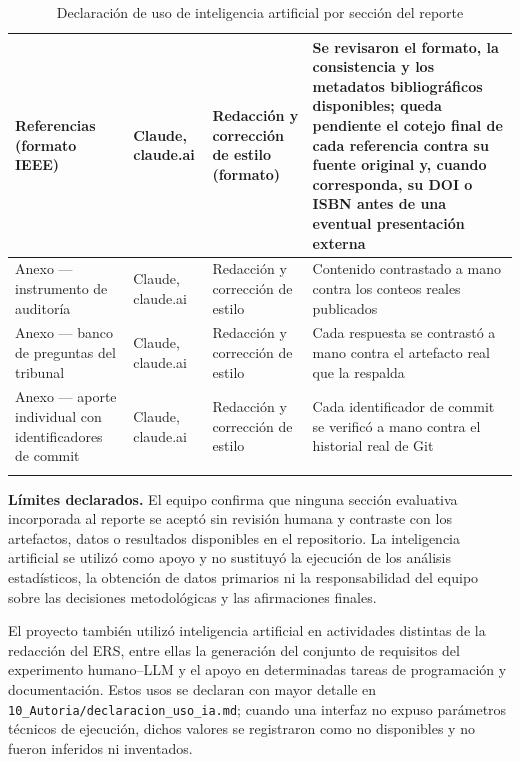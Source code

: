 \begin{longtable}{|L{2.6cm}|L{3.0cm}|L{3.6cm}|L{5.8cm}|}
Referencias (formato IEEE) & Claude, claude.ai & Redacción y corrección de estilo (formato) & Se revisaron el formato, la consistencia y los metadatos bibliográficos disponibles; queda pendiente el cotejo final de cada referencia contra su fuente original y, cuando corresponda, su DOI o ISBN antes de una eventual presentación externa \\ \hline
Anexo --- instrumento de auditoría & Claude, claude.ai & Redacción y corrección de estilo & Contenido contrastado a mano contra los conteos reales publicados \\ \hline
Anexo --- banco de preguntas del tribunal & Claude, claude.ai & Redacción y corrección de estilo & Cada respuesta se contrastó a mano contra el artefacto real que la respalda \\ \hline
Anexo --- aporte individual con identificadores de commit & Claude, claude.ai & Redacción y corrección de estilo & Cada identificador de commit se verificó a mano contra el historial real de Git \\ \hline
\caption{Declaración de uso de inteligencia artificial por sección del reporte}
\end{longtable}

\noindent\textbf{Límites declarados.} El equipo confirma que ninguna sección
evaluativa incorporada al reporte se aceptó sin revisión humana y contraste
con los artefactos, datos o resultados disponibles en el repositorio. La
inteligencia artificial se utilizó como apoyo y no sustituyó la ejecución de
los análisis estadísticos, la obtención de datos primarios ni la responsabilidad
del equipo sobre las decisiones metodológicas y las afirmaciones finales.

El proyecto también utilizó inteligencia artificial en actividades distintas
de la redacción del ERS, entre ellas la generación del conjunto de requisitos
del experimento humano--LLM y el apoyo en determinadas tareas de programación
y documentación. Estos usos se declaran con mayor detalle en
\texttt{10\_Autoria/declaracion\_uso\_ia.md}; cuando una interfaz no expuso
parámetros técnicos de ejecución, dichos valores se registraron como no
disponibles y no fueron inferidos ni inventados.
